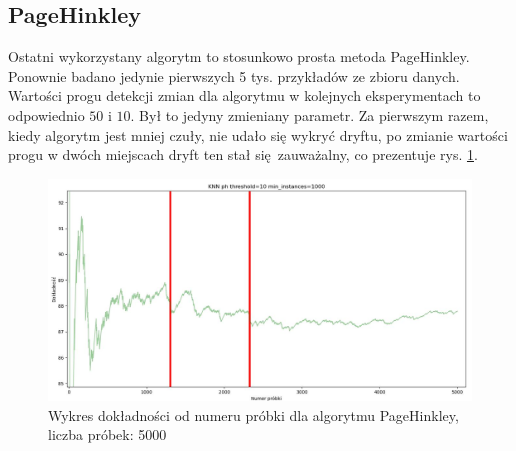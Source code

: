 \documentclass{classrep}
\begin{document}
{        \subsection{PageHinkley} {
            Ostatni wykorzystany algorytm to stosunkowo prosta metoda PageHinkley. Ponownie badano
            jedynie pierwszych 5 tys. przykładów ze zbioru danych. Wartości progu detekcji zmian dla
            algorytmu w kolejnych eksperymentach to odpowiednio $50$ i $10$. Był to jedyny zmieniany
            parametr. Za pierwszym razem, kiedy algorytm jest mniej czuły, nie udało się wykryć
            dryftu, po zmianie wartości progu w dwóch miejscach dryft ten stał się zauważalny, co
            prezentuje rys. \ref{fig:ph_too_sensitive}.

            \begin{figure}[!htbp]
                \centering
                \includegraphics[width=\textwidth]{img/ph_too_sensitive.jpg}
                \caption
                {Wykres dokładności od numeru próbki dla algorytmu PageHinkley, liczba próbek: 5000}
                \label{fig:ph_too_sensitive}
            \end{figure}
            \FloatBarrier
        }
    }
\end{document}
